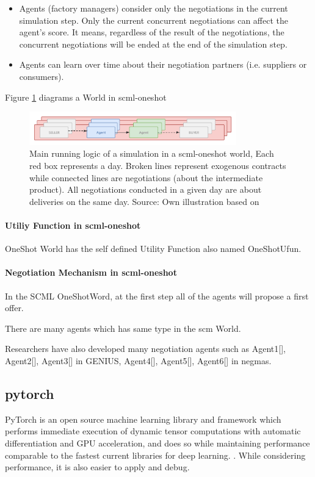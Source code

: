 \begin{itemize}
	\item Agents (factory managers) consider only the negotiations in the current simulation step. Only the current concurrent negotiations can affect the agent's score. It means, regardless of the result of the negotiations, the concurrent negotiations will be ended at the end of the simulation step. 
	\item Agents can learn over time about their negotiation partners (i.e. suppliers or consumers).
\end{itemize} 

Figure \ref{fig:overview-scml-oneshot} diagrams a World in \gls{scml-oneshot}

\begin{figure}[htbp]
\centering
\includegraphics[width=0.8\textwidth]{./images/overview-scml-oneshot.png}
\caption{Main running logic of a simulation in a \gls{scml-oneshot} world, Each red box represents a day. Broken lines represent exogenous contracts while connected lines are negotiations (about the intermediate product). All negotiations conducted in a given day are about deliveries on the same day. Source: Own illustration based on\parencite{Mohammad2021}}
\label{fig:overview-scml-oneshot}
\end{figure}

\paragraph{Utiliy Function in \gls{scml-oneshot}} OneShot World has the self defined Utility Function also named OneShotUfun.
\paragraph{Negotiation Mechanism in \gls{scml-oneshot}} In the SCML OneShotWord, at the first step all of the agents will propose a first offer.

There are many agents which has same type in the \gls{scm} World. 

Researchers have also developed many negotiation agents such as Agent1[], Agent2[], Agent3[] in GENIUS, Agent4[], Agent5[], Agent6[] in \gls{negmas}.

\subsection{\gls{pytorch}} PyTorch is an open source machine learning library and framework which performs immediate execution of dynamic tensor computations with automatic differentiation and GPU acceleration, and does so while maintaining performance comparable to the fastest current libraries for deep learning. \parencite{NEURIPS2019_bdbca288}. While considering performance, it is also easier to apply and debug.

